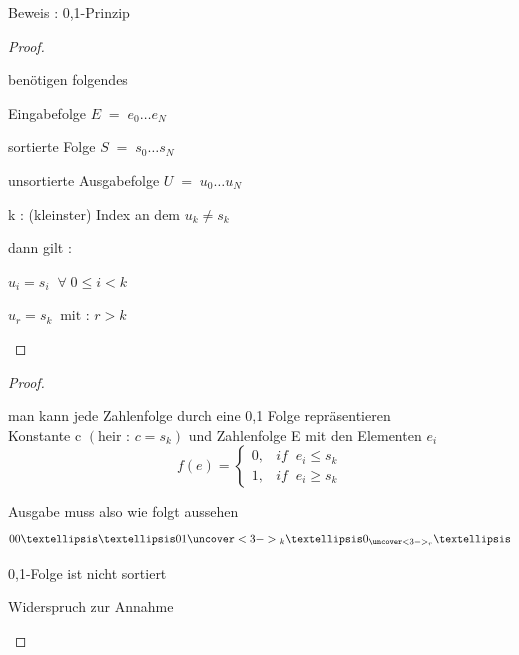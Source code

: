 \documentclass[ucs,9pt]{beamer}
\begin{document}
\begin{frame}{Beweis : 0,1-Prinzip}
\begin{proof}
\begin{itemize}
\item benötigen folgendes
\begin{itemize}
 {\item Eingabefolge $E \; = \; e_0 … e_N$}
 {\item sortierte Folge $S\; = \; s_0 … s_N$}
 {\item unsortierte Ausgabefolge $U \; = \; u_0 … u_N$}
 {\item k : (kleinster) Index an dem $u_k \neq s_k$}
\end{itemize}
 {\item dann gilt :
\begin{enumerate}
\item[(1)] $u_i = s_i \;\;\forall \;0 \leq i < k$ 
 {\item[(2)] $u_r = s_k \;\; \text{mit : }r>k  $}
\end{enumerate}}
\end{itemize}
\end{proof}
\end{frame} 

\begin{frame}
\begin{proof}
\begin{itemize}
\item 
    man kann jede Zahlenfolge durch eine 0,1 Folge repräsentieren\\
    Konstante c $(\text{heir : }c = s_k)$ und Zahlenfolge E mit den Elementen $e_i$\\
    $$
    f(e) = \begin{cases} 0 , & if \;\; e_i \leq s_k \\
    1 , & if \;\; e_i \geq s_k
    \end{cases}$$
 {\item Ausgabe muss also wie folgt aussehen 
$$ 00 …… 01{\uncover <3-> {_k}}…0_{\uncover <3-> {_r}} …$$}
 {\item[$\Rightarrow$] 0,1-Folge ist nicht sortiert}
 {\item[$\Rightarrow$] Widerspruch zur Annahme }
\end{itemize}
\end{proof}
\end{frame}
\end{document}
